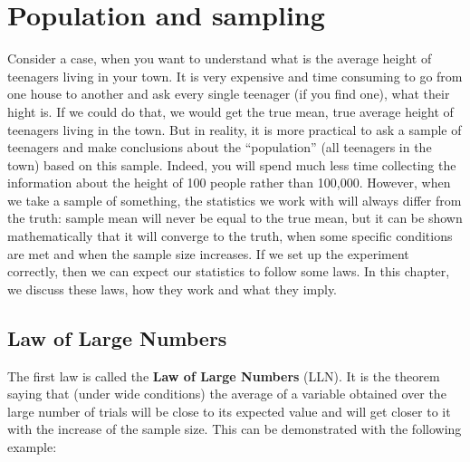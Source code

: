 \documentclass[
]{book}
\theoremstyle{definition}
\theoremstyle{definition}
\theoremstyle{definition}
\theoremstyle{definition}
\theoremstyle{remark}
\begin{document}
\hypertarget{PopulationSampling}{%
\chapter{Population and sampling}\label{PopulationSampling}}

Consider a case, when you want to understand what is the average height of teenagers living in your town. It is very expensive and time consuming to go from one house to another and ask every single teenager (if you find one), what their hight is. If we could do that, we would get the true mean, true average height of teenagers living in the town. But in reality, it is more practical to ask a sample of teenagers and make conclusions about the ``population'' (all teenagers in the town) based on this sample. Indeed, you will spend much less time collecting the information about the height of 100 people rather than 100,000. However, when we take a sample of something, the statistics we work with will always differ from the truth: sample mean will never be equal to the true mean, but it can be shown mathematically that it will converge to the truth, when some specific conditions are met and when the sample size increases. If we set up the experiment correctly, then we can expect our statistics to follow some laws. In this chapter, we discuss these laws, how they work and what they imply.

\hypertarget{LLN}{%
\section{Law of Large Numbers}\label{LLN}}

The first law is called the \textbf{Law of Large Numbers} (LLN). It is the theorem saying that (under wide conditions) the average of a variable obtained over the large number of trials will be close to its expected value and will get closer to it with the increase of the sample size. This can be demonstrated with the following example:
\end{document}
